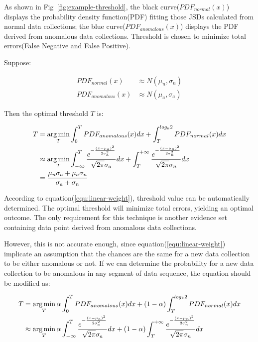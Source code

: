 \documentclass[a4paper]{IEEEtran}
\begin{document}
			As shown in Fig~\ref{fig:example-threshold}, the black curve($PDF_{normal}(x)$) displays the probability density function(PDF) fitting those JSDs calculated from normal data collections; the blue curve($PDF_{anomalous}(x)$) displays the PDF derived from anomalous data collections. Threshold is chosen to minimize total errors(False Negative and False Positive).
			
			Suppose:
			
			\begin{align}
				PDF_{normal}(x) &\approx N(\mu_n, \sigma_n)\\
				PDF_{anomalous}(x) &\approx N(\mu_a, \sigma_a)
			\end{align}
			
			Then the optimal threshold $T$ is:
			
			\begin{equation}\label{equ:linear-weight}
				\small
				\begin{split}
					T &= \mathop{\arg\min}_{T} \int_{0}^{T}PDF_{anomalous}(x)dx +
					 \int_{T}^{log_k2}PDF_{normal}(x)dx\\
					& \approx \mathop{\arg\min}_{T}
					\int_{-\infty}^{T}
					\frac{e^{-\frac{(x - \mu_a)^2}{2\sigma_a^2}}}{\sqrt{2\pi} \sigma_a}dx
					+ \int_{T}^{+\infty}
					\frac{e^{-\frac{(x - \mu_n)^2}{2\sigma_n^2}}}{\sqrt{2\pi} \sigma_n}dx\\
					& = \frac{\mu_n\sigma_a + \mu_a\sigma_n}{\sigma_a + \sigma_n}
				\end{split}
			\end{equation}
			
			According to equation(\ref{equ:linear-weight}), threshold value can be automatically determined. The optimal threshold will minimize total errors, yielding an optimal outcome. The only requirement for this technique is another evidence set containing data point derived from anomalous data collections.
			
			However, this is not accurate enough, since equation(\ref{equ:linear-weight}) implicate an assumption that the chances are the same for a new data collection to be either anomalous or not. If we can determine the probability for a new data collection to be anomalous in any segment of data sequence, the equation should be modified as:
			
			\begin{equation}\label{equ:linear-balanced}
				\small
				\begin{split}
					T & = \mathop{\arg\min}_{T} \alpha\int_{0}^{T}PDF_{anomalous}(x)dx +
				(1-\alpha)\int_{T}^{log_k2}PDF_{normal}(x)dx\\
					& \approx \mathop{\arg\min}_{T}
					\alpha\int_{-\infty}^{T}
					\frac{e^{-\frac{(x - \mu_a)^2}{2\sigma_a^2}}}{\sqrt{2\pi} \sigma_a}dx
					+ (1-\alpha)\int_{T}^{+\infty}
					\frac{e^{-\frac{(x - \mu_n)^2}{2\sigma_n^2}}}{\sqrt{2\pi} \sigma_n}dx
				\end{split}
			\end{equation}
			
\end{document}
